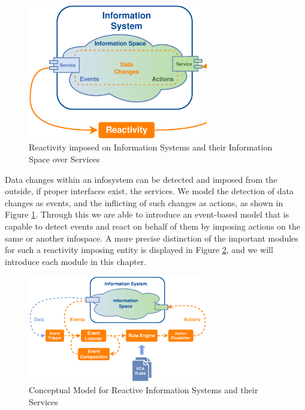 \begin{figure}[!ht]
  \centering
  \includegraphics[width=0.7\textwidth]{figures/IS_InformationSpace}
  \caption{Reactivity imposed on Information Systems and their Information Space over Services}
  \label{fig:IS_InformationSpace}
\end{figure}
Data changes within an \textrm{\gls{infosystem}} can be detected and imposed from the outside, if proper interfaces exist, the services.
We model the detection of data changes as events, and the inflicting of such changes as actions, as shown in Figure \ref{fig:IS_InformationSpace}.
Through this we are able to introduce an event-based model that is capable to detect events and react on behalf of them by imposing actions on the same or another \textrm{\gls{infospace}}.
A more precise distinction of the important modules for such a reactivity imposing entity is displayed in Figure \ref{fig:Standard-Model-Template}, and we will introduce each module in this chapter.
\begin{figure}[!ht]
  \centering
  \includegraphics[width=0.7\textwidth]{figures/Standard-Model-Template}
  \caption{Conceptual Model for Reactive Information Systems and their Services}
  \label{fig:Standard-Model-Template}
\end{figure}



